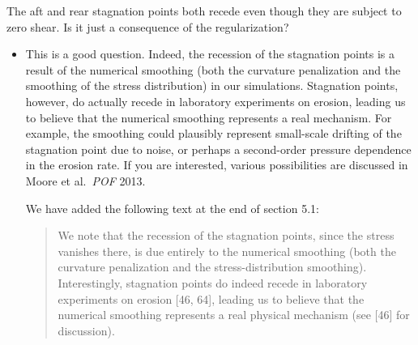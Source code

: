 \documentclass[11pt]{article}
\newcommand{\comment}[1]{{\color{blue} #1}}
\begin{document}
\noindent
\comment{The aft and rear stagnation points both recede even though they
are subject to zero shear. Is it just a consequence of the
regularization?}
\begin{itemize}
\item
This is a good question. Indeed, the recession of the stagnation points is a result of the numerical smoothing (both the curvature penalization and the smoothing of the stress distribution) in our simulations. Stagnation points, however, do actually recede in laboratory experiments on erosion, leading us to believe that the numerical smoothing represents a real mechanism. For example, the smoothing could plausibly represent small-scale drifting of the stagnation point due to noise, or perhaps a second-order pressure dependence in the erosion rate. If you are interested, various possibilities are discussed in Moore et al.~{\it POF} 2013.

We have added the following text at the end of section 5.1:
\begin{quotation}
We note that the recession of the stagnation points, since the stress
vanishes there, is due entirely to the numerical smoothing (both the
curvature penalization and the stress-distribution smoothing).
Interestingly, stagnation points do indeed recede in laboratory
experiments on erosion [46, 64], leading us to believe that the
numerical smoothing represents a real physical mechanism (see [46] for
discussion).
%
\end{quotation}

\end{itemize}
\end{document}
